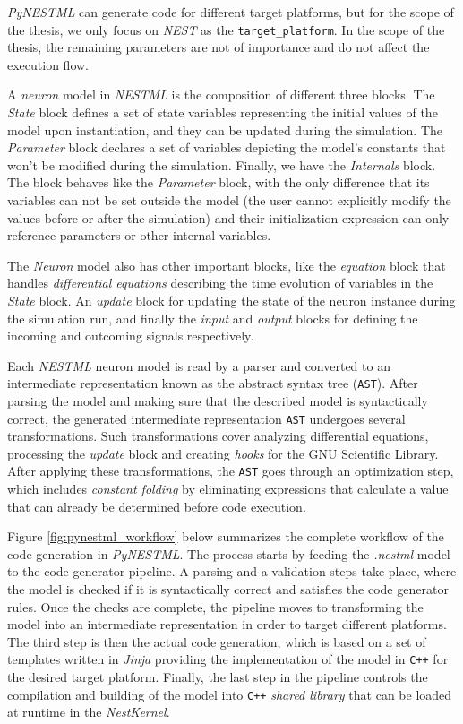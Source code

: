 \emph{PyNESTML} can generate code for different target platforms, but for the scope of the thesis, we only focus on \emph{NEST} as the \texttt{target\_platform}. In the scope of the thesis, the remaining parameters are not of importance and do not affect the execution flow.

A \emph{neuron} model in \emph{NESTML} is the composition of different three blocks. The \emph{State} block defines a set of state variables representing the initial values of the model upon instantiation, and they can be updated during the simulation. The \emph{Parameter} block declares a set of variables depicting the model's constants that won't be modified during the simulation. Finally, we have the \emph{Internals} block. The block behaves like the \emph{Parameter} block, with the only difference that its variables can not be set outside the model (the user cannot explicitly modify the values before or after the simulation) and their initialization expression can only reference parameters or other internal variables.
 
 
The \emph{Neuron} model also has other important blocks, like the \emph{equation} block that handles \emph{differential equations} describing the time evolution of variables in the \emph{State} block. An \emph{update} block for updating the state of the neuron instance during the simulation run, and finally the \emph{input} and \emph{output} blocks for defining the incoming and outcoming signals respectively.

Each \emph{NESTML} neuron model is read by a parser and converted to an intermediate representation known as the abstract syntax tree (\texttt{AST}). After parsing the model and making sure that the described model is syntactically correct, the generated intermediate representation \texttt{AST} undergoes several transformations. Such transformations cover analyzing differential equations, processing the \emph{update} block and creating \emph{hooks} for the GNU Scientific Library. After applying these transformations, the \texttt{AST} goes through an optimization step, which includes \emph{constant folding} by eliminating expressions that calculate a value that can already be determined before code execution.
 
Figure \ref{fig:pynestml_workflow} below summarizes the complete workflow of the code generation in \emph{PyNESTML}. The process starts by feeding the \emph{.nestml} model to the code generator pipeline. A parsing and a validation steps take place, where the model is checked if it is syntactically correct and satisfies the code generator rules. Once the checks are complete, the pipeline moves to transforming the model into an intermediate representation in order to target different platforms. The third step is then the actual code generation, which is based on a set of templates written in \emph{Jinja} providing the implementation of the model in \texttt{C++} for the desired target platform. Finally, the last step in the pipeline controls the compilation and building of the model into \texttt{C++} \emph{shared library}  that can be loaded at runtime in the \emph{NestKernel}.


